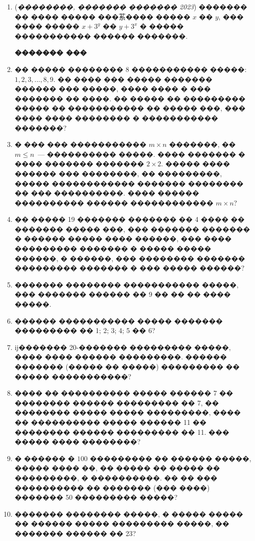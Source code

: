 \documentclass[a4paper,12pt]{article}
\begin{document}
\begin{enumerate}
\item (\textit{��������, ������� ������� 2023}) ������� �� ���� ����� ���䒺���� ����� $x$ �� $y$, ��� ���� ����� $x + 3^{y}$ �� $y + 3^{x}$ � ����� ����������� ������ �������.




\textbf{������� ���}

\item �� ����� �������� 8 ����������� �����: $1, 2, 3,...,8, 9$. �� ���� ��� ����� ������� ������ ��� �����, ���� ���� � ��� ������� �� ����. �� ����� �� ��������� ����� �� ����������� �� ����� ���, ��� ���� ���� �������� � ����������� �������?

\item � ��� ��� ����������� $m\times n$ �������, �� $m\leq n$~--- ���������� �����. ���� ������� � ���� ������� ������� $2\times 2$. ����� ���� ������ ��� ��������, �� ���������, ����� ������������ ������� �������� �� ��� ����������. ���� ������ ���������� ������ ������������ $m\times n$?

\item �� ����� 19 ������� ������� �� 4 ���� �� ������� ����� ���, ��� ������� ������� � ������ ����� ���� ������, ��� ���� ��������� ������� � ����� ����� ������, � ������, ��� �������� ������� ��������� ������� � ��� ����� ������?

\item ������� �������� ����������� �����, ��� ������� ������ �� 9 �� �� �� ���� �����.

\item ������ ����������� ����� ������� ��������� �� 1; 2; 3; 4; 5 �� 6?

\item ĳ������� 20-������� ��������� �����, ���� ���� ������ ���������. ������ ������� (����� �� �����) ��������� �� ����� �����������?


\item ���� �� ���������� ����� ������ 7 �� �������� ������ ��������� �� 7, �� �������� ����� ����� ���������, ���� �� ���������� ����� ������ 11 �� �������� ������ ��������� �� 11. ��� ����� ���� ��������?

\item � ������ � $100$ ��������� �� ������ �����, ����� ���� ��, �� ����� �� ����� �� ���������, � ����������. �� �� ��� ���������� �� ������� (��� ����) ������� 50 ��������� �����?

\item ������� �������� �����, � ����� ����� �� ������ ����� ��������� �����, �� ������� ������ �� 23?


\end{enumerate}
\end{document}
